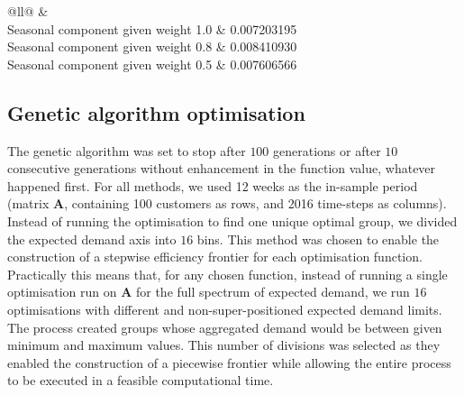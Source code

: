 \documentclass[review, 3p, 12pt, authoryear]{elsarticle}
\begin{document}
\begin{table}[]
	\centering
	\caption{Results for SS function running with different configuration on weights given to bi-objective function}
	\label{tb_ssmix_r}
	\begin{tabular}{@{}ll@{}}
	\toprule
	 &  \\ \midrule
	Seasonal component given weight 1.0                                                                            & 0.007203195                               	\\
	Seasonal component given weight 0.8                                                                            & 0.008410930                               	\\
	Seasonal component given weight 0.5                                                                            & 0.007606566                               	\\ \bottomrule
	\end{tabular}
\end{table}

\subsection{Genetic algorithm optimisation}
\label{ss:genoud}

The genetic algorithm was set to stop after $100$ generations or after $10$ consecutive generations without enhancement in the function value, whatever happened first.
For all methods, we used 12 weeks as the in-sample period (matrix $\bm{A}$, containing 100 customers as rows, and 2016 time-steps as columns).
Instead of running the optimisation to find one unique optimal group, we divided the expected demand axis into $16$ bins.
This method was chosen to enable the construction of a stepwise efficiency frontier for each optimisation function.
Practically this means that, for any chosen function, instead of running a single optimisation run on $\bm{A}$ for the full spectrum of expected demand, we run $16$ optimisations with different and non-super-positioned expected demand limits.
The process created groups whose aggregated demand would be between given minimum and maximum values.
This number of divisions was selected as they enabled the construction of a piecewise frontier while allowing the entire process to be executed in a feasible computational time.
\end{document}
